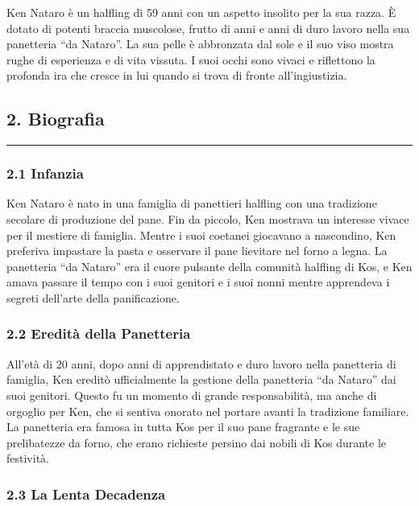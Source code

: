 Ken Nataro è un halfling di 59 anni con un aspetto insolito per la sua
razza. È dotato di potenti braccia muscolose, frutto di anni e anni di
duro lavoro nella sua panetteria ``da Nataro''. La sua pelle è
abbronzata dal sole e il suo viso mostra rughe di esperienza e di vita
vissuta. I suoi occhi sono vivaci e riflettono la profonda ira che
cresce in lui quando si trova di fronte all'ingiustizia.

\subsection{2. Biografia}\label{biografia}

\begin{center}\rule{0.5\linewidth}{0.5pt}\end{center}

\subsubsection{2.1 Infanzia}\label{infanzia}

Ken Nataro è nato in una famiglia di panettieri halfling con una
tradizione secolare di produzione del pane. Fin da piccolo, Ken mostrava
un interesse vivace per il mestiere di famiglia. Mentre i suoi coetanei
giocavano a nascondino, Ken preferiva impastare la pasta e osservare il
pane lievitare nel forno a legna. La panetteria ``da Nataro'' era il
cuore pulsante della comunità halfling di Kos, e Ken amava passare il
tempo con i suoi genitori e i suoi nonni mentre apprendeva i segreti
dell'arte della panificazione.

\subsubsection{\texorpdfstring{2.2 \textbf{Eredità della
Panetteria}}{2.2 Eredità della Panetteria}}\label{eredituxe0-della-panetteria}

All'età di 20 anni, dopo anni di apprendistato e duro lavoro nella
panetteria di famiglia, Ken ereditò ufficialmente la gestione della
panetteria ``da Nataro'' dai suoi genitori. Questo fu un momento di
grande responsabilità, ma anche di orgoglio per Ken, che si sentiva
onorato nel portare avanti la tradizione familiare. La panetteria era
famosa in tutta Kos per il suo pane fragrante e le sue prelibatezze da
forno, che erano richieste persino dai nobili di Kos durante le
festività.

\subsubsection{\texorpdfstring{2.3 \textbf{La Lenta
Decadenza}}{2.3 La Lenta Decadenza}}\label{la-lenta-decadenza}

